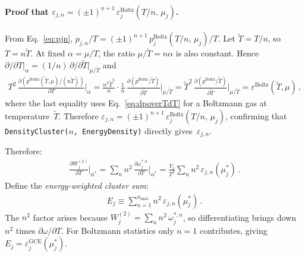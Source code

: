 \documentclass[11pt]{article}
\newcommand{\GCE}{\mathrm{GCE}}
\begin{document}
\paragraph{Proof that $\varepsilon_{j,n} = (\pm 1)^{n+1}\,\varepsilon_j^{\mathrm{Boltz}}(T/n,\,\mu_j)$.}
From Eq.~\eqref{eq:pjn}, $p_{j,n}/T = (\pm 1)^{n+1}\,p_j^{\mathrm{Boltz}}(T/n,\,\mu_j)/T$.
Let $\tilde{T} = T/n$, so $T = n\tilde{T}$.
At fixed $\alpha = \mu/T$, the ratio $\mu/\tilde{T} = n\alpha$ is also constant.
Hence $\partial/\partial T\big|_\alpha = (1/n)\,\partial/\partial\tilde{T}\big|_{\mu/\tilde{T}}$ and
\begin{align}
  T^2\,\frac{\partial(p^{\mathrm{Boltz}}(\tilde{T},\mu)/(n\tilde{T}))}{\partial T}\bigg|_\alpha
  = \frac{n^2\tilde{T}^2}{n}\cdot\frac{1}{n}\,\frac{\partial(p^{\mathrm{Boltz}}/\tilde{T})}{\partial\tilde{T}}\bigg|_{\mu/\tilde{T}}
  = \tilde{T}^2\,\frac{\partial(p^{\mathrm{Boltz}}/\tilde{T})}{\partial\tilde{T}}\bigg|_{\mu/\tilde{T}}
  = \varepsilon^{\mathrm{Boltz}}(\tilde{T},\mu) \,,
\end{align}
where the last equality uses Eq.~\eqref{eq:dpoverTdT} for a Boltzmann gas at temperature~$\tilde{T}$.
Therefore $\varepsilon_{j,n} = (\pm 1)^{n+1}\,\varepsilon_j^{\mathrm{Boltz}}(T/n,\,\mu_j)$, confirming that \texttt{DensityCluster($n$, EnergyDensity)} directly gives~$\varepsilon_{j,n}$.

Therefore:
\begin{align}
  \frac{\partial W_j^{(2)}}{\partial T}\bigg|_{\alpha^*}
  = \sum_n n^2\,\frac{\partial\omega_j^{*,n}}{\partial T}\bigg|_{\alpha^*}
  = \frac{V_c}{T^2}\sum_n n^2\,\varepsilon_{j,n}(\mu_j^*) \,.
  \label{eq:dW2dT}
\end{align}
Define the \emph{energy-weighted cluster sum}:
\begin{align}
  E_j \equiv \sum_{n=1}^{n_\mathrm{max}} n^2\,\varepsilon_{j,n}(\mu_j^*) \,.
  \label{eq:Ej}
\end{align}
The $n^2$ factor arises because $W_j^{(2)} = \sum_n n^2\,\omega_j^{*,n}$, so differentiating brings down $n^2$ times $\partial\omega/\partial T$.
For Boltzmann statistics only $n=1$ contributes, giving $E_j = \varepsilon_j^{\GCE}(\mu_j^*)$.
\end{document}
